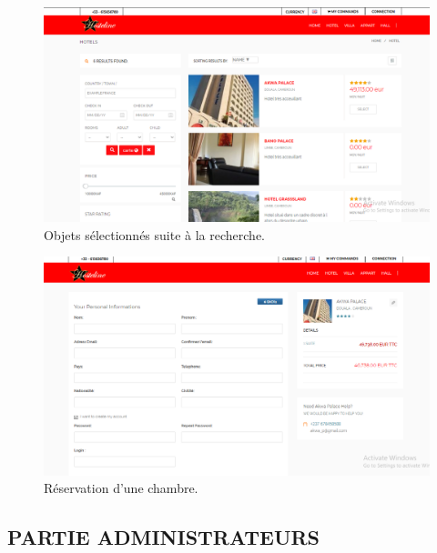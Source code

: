  

\begin{figure}[h]
	\begin{center}
		\includegraphics[scale=0.5]{images/search.png}
		\caption{Objets sélectionnés suite à la recherche.}
		\label{synthese-cout-salariefd}
	\end{center}
\end{figure}
 



 \begin{figure}[h]
	\begin{center}
		\includegraphics[scale=0.5]{images/booking.png}
		\caption{Réservation d’une chambre.}
		\label{synthese-cout-salardcf}
	\end{center}
\end{figure}




\subsection{PARTIE ADMINISTRATEURS}

